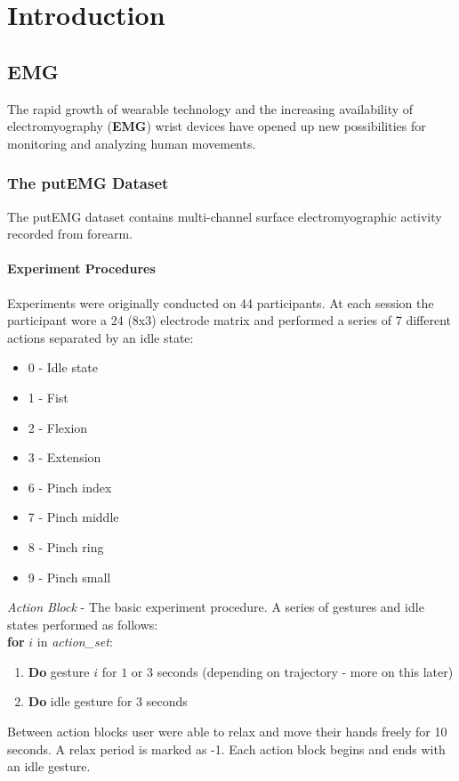 \chapter{Introduction}
\section{EMG}
The rapid growth of wearable technology and the increasing availability of electromyography (\textbf{EMG}) wrist devices have opened up new possibilities for monitoring and analyzing human movements. \\

\subsection{The putEMG Dataset}
The putEMG dataset \cite{Kaczmarek2019PutEMGADataset} contains multi-channel surface electromyographic activity recorded from forearm. 
\subsubsection{Experiment Procedures}
Experiments were originally conducted on 44 participants. At each session the participant wore a 24 (8x3) electrode matrix and performed a series of 7 different actions separated by an idle state:
\begin{itemize}
    \item 0 - Idle state
    \item 1 - Fist
    \item 2 - Flexion
    \item 3 - Extension
    \item 6 - Pinch index
    \item 7 - Pinch middle
    \item 8 - Pinch ring
    \item 9 - Pinch small
\end{itemize}

\textit{Action Block} - The basic experiment procedure. A series of gestures and idle states performed as follows:\\

\textbf{for} $i$ in \textit{action\_set}:
\begin{enumerate}
    \item  \textbf{Do} gesture $i$ for $1$ or $3$ seconds (depending on trajectory - more on this later)
    \item   \textbf{Do} idle gesture for $3$ seconds
\end{enumerate}
 Between action blocks user were able to relax and move their hands freely for 10 seconds. A relax period is marked as -1. Each action block begins and ends with an idle gesture.


